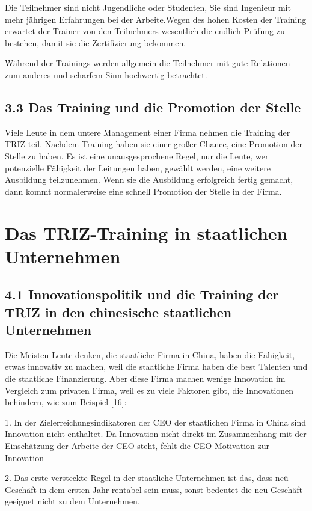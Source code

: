 \documentclass[11pt,a4paper]{article}
\begin{document}
Die Teilnehmer sind nicht Jugendliche oder Studenten, Sie sind Ingenieur mit
mehr jährigen Erfahrungen bei der Arbeite.Wegen des hohen Kosten der Training
erwartet der Trainer von den Teilnehmers wesentlich die endlich Prüfung zu
bestehen, damit sie die Zertifizierung bekommen.

Während der Trainings werden allgemein die Teilnehmer mit gute Relationen zum
anderes und scharfem Sinn  hochwertig betrachtet.


\subsection{3.3 Das Training und die Promotion der Stelle}

Viele Leute in dem untere Management einer Firma nehmen die Training der TRIZ
teil. Nachdem Training haben sie einer großer Chance, eine Promotion der
Stelle zu haben. Es ist eine unausgesprochene Regel, nur die Leute, wer
potenzielle Fähigkeit der Leitungen haben, gewählt werden, eine weitere
Ausbildung  teilzunehmen. Wenn sie die Ausbildung erfolgreich fertig gemacht,
dann kommt normalerweise eine schnell Promotion der Stelle in der Firma.  

\section{Das TRIZ-Training in staatlichen Unternehmen}

\subsection{4.1 Innovationspolitik und die Training der TRIZ in den chinesische
staatlichen Unternehmen}

Die Meisten Leute denken, die staatliche Firma in China, haben die Fähigkeit,
etwas innovativ zu machen, weil die staatliche Firma haben die best Talenten
und die staatliche Finanzierung. Aber diese Firma machen wenige Innovation im
Vergleich zum privaten Firma, weil es zu viele Faktoren gibt, die Innovationen
behindern, wie zum Beispiel [16]:

1. In der Zielerreichungsindikatoren der CEO der staatlichen Firma in China
sind Innovation nicht enthaltet. Da Innovation nicht direkt im Zusammenhang
mit der Einschätzung der Arbeite der CEO steht, fehlt die CEO Motivation zur
Innovation

2. Das erste versteckte Regel in der staatliche Unternehmen ist  das, dass
neü Geschäft  in dem ersten Jahr rentabel sein muss, sonst bedeutet die neü
Geschäft geeignet nicht zu dem Unternehmen.
\end{document}
